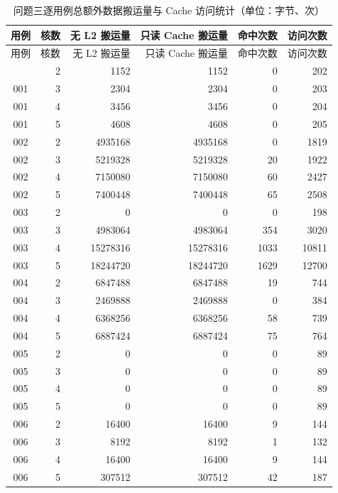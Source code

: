 \scriptsize
\setlength{\tabcolsep}{2.5pt}
\renewcommand{\arraystretch}{0.95}
\begin{longtable}{|c|r|r|r|r|r|}
\caption{问题三逐用例总额外数据搬运量与 Cache 访问统计（单位：字节、次）}\label{tab:q3_traffic}\\
\hline
用例 & 核数 & 无 L2 搬运量 & 只读 Cache 搬运量 & 命中次数 & 访问次数 \\
\hline
\endfirsthead
\hline
用例 & 核数 & 无 L2 搬运量 & 只读 Cache 搬运量 & 命中次数 & 访问次数 \\
\hline
\endhead
\hline
\endfoot
001 & 2 & 1152 & 1152 & 0 & 202 \\
\hline
001 & 3 & 2304 & 2304 & 0 & 203 \\
\hline
001 & 4 & 3456 & 3456 & 0 & 204 \\
\hline
001 & 5 & 4608 & 4608 & 0 & 205 \\
\hline
002 & 2 & 4935168 & 4935168 & 0 & 1819 \\
\hline
002 & 3 & 5219328 & 5219328 & 20 & 1922 \\
\hline
002 & 4 & 7150080 & 7150080 & 60 & 2427 \\
\hline
002 & 5 & 7400448 & 7400448 & 65 & 2508 \\
\hline
003 & 2 & 0 & 0 & 0 & 198 \\
\hline
003 & 3 & 4983064 & 4983064 & 354 & 3020 \\
\hline
003 & 4 & 15278316 & 15278316 & 1033 & 10811 \\
\hline
003 & 5 & 18244720 & 18244720 & 1629 & 12700 \\
\hline
004 & 2 & 6847488 & 6847488 & 19 & 744 \\
\hline
004 & 3 & 2469888 & 2469888 & 0 & 384 \\
\hline
004 & 4 & 6368256 & 6368256 & 58 & 739 \\
\hline
004 & 5 & 6887424 & 6887424 & 75 & 764 \\
\hline
005 & 2 & 0 & 0 & 0 & 89 \\
\hline
005 & 3 & 0 & 0 & 0 & 89 \\
\hline
005 & 4 & 0 & 0 & 0 & 89 \\
\hline
005 & 5 & 0 & 0 & 0 & 89 \\
\hline
006 & 2 & 16400 & 16400 & 9 & 144 \\
\hline
006 & 3 & 8192 & 8192 & 1 & 132 \\
\hline
006 & 4 & 16400 & 16400 & 9 & 144 \\
\hline
006 & 5 & 307512 & 307512 & 42 & 187 \\

\end{longtable}

